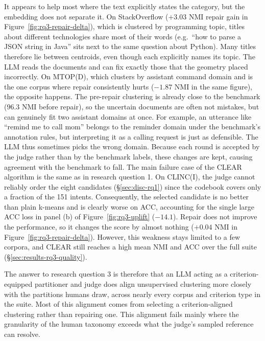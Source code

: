 \documentclass[11pt,a4paper,oneside]{report}
\begin{document}
It appears to help most where the text explicitly states the category, but the
embedding does not separate it. On StackOverflow ($+3.03$ NMI repair
gain in Figure~\ref{fig:rq3-repair-delta}), which is clustered by
programming topic, titles about different technologies share most of
their words (e.g.\ ``how to parse a JSON string in Java'' sits next to the
same question about Python). Many titles therefore lie between
centroids, even though each explicitly names its topic. The LLM reads
the documents and can fix exactly those that the geometry placed
incorrectly. On MTOP(D), which clusters by assistant command domain and
is the one corpus where repair consistently hurts ($-1.87$ NMI in the
same figure), the opposite happens. The pre-repair clustering is already
close to the benchmark ($96.3$ NMI before repair), so the uncertain documents are often not
mistakes, but can genuinely fit two assistant domains at once. For example,
an utterance like ``remind me to call mom'' belongs to the reminder domain
under the benchmark's annotation rules, but interpreting it as a calling
request is just as defensible. The LLM thus sometimes picks the wrong
domain. Because each round is accepted by the judge rather than by the
benchmark labels, these changes are kept, causing agreement with the
benchmark to fall. The main failure case of the CLEAR algorithm is the same as in
research question 1. On CLINC(I), the judge cannot reliably order the
eight candidates (\S\ref{sec:disc-rq1}) since the codebook
covers only a fraction of the 151 intents. Consequently, the selected
candidate is no better than plain k-means and is clearly worse on ACC,
accounting for the single large ACC loss in panel (b) of
Figure~\ref{fig:rq3-uplift} ($-14.1$). Repair does not improve the
performance, so it changes the score by
almost nothing ($+0.04$ NMI in Figure~\ref{fig:rq3-repair-delta}). However, this weakness stays limited to a few corpora, and CLEAR
still reaches a high mean NMI and ACC over the
full suite (\S\ref{sec:results-rq3-quality}).


The answer to research question 3 is therefore that an LLM acting as a criterion-equipped partitioner and judge does align unsupervised clustering more closely with the partitions humans draw, across nearly every corpus and criterion type in the suite. Most of this alignment comes from selecting a criterion-aligned clustering rather than repairing one. This alignment fails mainly where the granularity of the human taxonomy exceeds what the judge's sampled reference can resolve.
\end{document}
